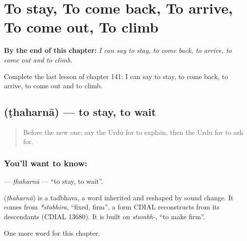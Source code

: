 
\chapter{To stay, To come back, To arrive, To come out, To climb}
\label{ch:ur-to-stay-to-come-back-to-arrive-to-come-out-to-climb}

\begin{chapteropening}
\textbf{By the end of this chapter:} \emph{I can say to stay, to come back, to arrive, to come out and to climb.}

Complete the last lesson of chapter 141: I can say to stay, to come back, to arrive, to come out and to climb.
\end{chapteropening}

\section[\texorpdfstring{\ur{ٹھہرنا} (ṭhaharnā)}{ٹھہرنا (ṭhaharnā)}]{ (ṭhaharnā) — to stay, to wait}

\label{lesson:UR-C141-thaharna}



\begin{quote}
Before the new one: say the Urdu for to explain, then the Urdu for to ask for.
\end{quote}

\subsection*{You'll want to know: }
\textbf{} — \emph{ṭhaharnā} — \textquotedblleft{}to stay, to wait\textquotedblright{}.

\begin{cousinweb}
\textbf{} (\emph{ṭhaharnā}) is a tadbhava, a word inherited and reshaped by sound change. It comes from \emph{*stabhira}, \textquotedblleft{}fixed, firm\textquotedblright{}, a form CDIAL reconstructs from its descendants (CDIAL 13680). It is built on \emph{stambh-}, \textquotedblleft{}to make firm\textquotedblright{}.
\end{cousinweb}

\begin{grammarlens}[title={What you've built}]
One more word for this chapter.
\end{grammarlens}

